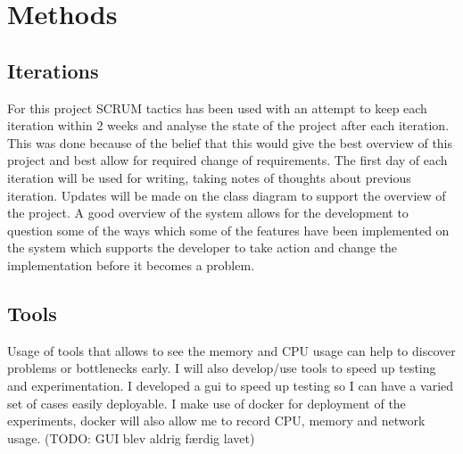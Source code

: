 \section{Methods}
	\subsection{Iterations}
	For this project SCRUM tactics has been used with an attempt to keep each iteration within 2 weeks and analyse the state of the project after each iteration. This was done because of the belief that this would give the best overview of this project and best allow for required change of requirements. The first day of each iteration will be used for writing, taking notes of thoughts about previous iteration. Updates will be made on the class diagram to support the overview of the project. A good overview of the system allows for the development to question some of the ways which some of the features have been implemented on the system which supports the developer to take action and change the implementation before it becomes a problem.
	\subsection{Tools}
	Usage of tools that allows to see the memory and CPU usage can help to discover problems or bottlenecks early. I will also develop/use tools to speed up testing and experimentation. I developed a \gls{gui} to speed up testing so I can have a varied set of cases easily deployable. I make use of docker for deployment of the experiments, docker will also allow me to record CPU, memory and network usage.
	(TODO: GUI blev aldrig færdig lavet)
